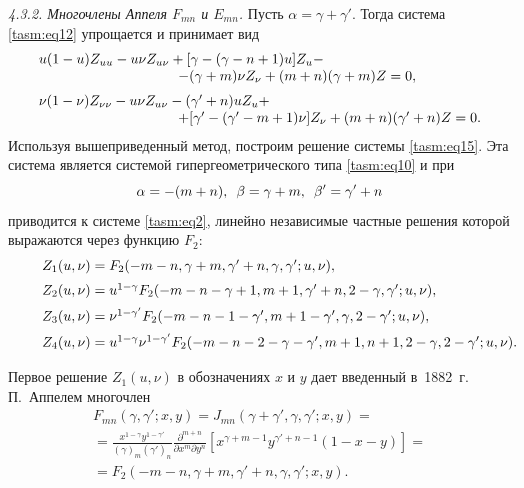\smallskip

\textit{4.3.2. Многочлены Аппеля $F_{mn}$ и $E_{mn}$.} 
Пусть $\alpha=\gamma+\gamma'$. Тогда система \eqref{tasm:eq12} упрощается и принимает
вид
\begin{equation}
\begin{array}{l}
u(1-u)    Z_{uu}-u\nu    Z_{u\nu}+[\gamma-(\gamma-n+1)   
u]    Z_{u}-  \\
\hspace{3.5cm}- (\gamma+m)    \nu     Z_{\nu}+(m+n)    (\gamma+m)    Z=0,\\[2mm]
\nu(1-\nu)    Z_{\nu\nu}-u\nu    Z_{u\nu}-(\gamma'+n)   
u    Z_{u}+ \\ 
\hspace{3.5cm}
+ [\gamma'-(\gamma'-m+1)    \nu]    Z_{\nu}+(m+n)    (\gamma'+n)    Z=0.
\end{array}
\label{tasm:eq15}
\end{equation}
Используя вышеприведенный метод, построим решение системы \eqref{tasm:eq15}.
Эта система является системой гипергеометрического типа \eqref{tasm:eq10} и
при
$$
\alpha=-(m+n), \enskip \beta=\gamma+m, \enskip \beta'=\gamma'+n
$$
приводится к системе \eqref{tasm:eq2}, 
линейно независимые частные решения которой выражаются через функцию $F_{2}$:
\begin{equation}
\begin{array}{l}
Z_{1}(u,\nu)=F_{2}(-m-n, \gamma+m, \gamma'+n, \gamma, \gamma'; u, \nu),\\[0.2cm]
Z_{2}(u,\nu)=u^{1-\gamma}    F_{2}(-m-n-\gamma+1, m+1, \gamma'+n, 2-\gamma, \gamma'; u, \nu),\\[0.2cm]
Z_{3}(u,\nu)=\nu^{1-\gamma'}    F_{2}(-m-n-1-\gamma', m+1-\gamma', \gamma, 2-\gamma'; u, \nu),\\[0.2cm]
Z_{4}(u,\nu)=u^{1-\gamma}    \nu^{1-\gamma'}   
F_{2}(-m-n-2-\gamma-\gamma', m+1, n+1, 2-\gamma, 2-\gamma'; u, \nu). 
\end{array}\hspace{-1cm}
\label{tasm:eq16}
\end{equation}

Первое решение $Z_{1}(u,\nu)$ в обозначениях $x$ и $y$ дает \cite[p.~259]{tasm:9} введенный в~1882~г. П.~Аппелем многочлен
\begin{multline}
F_{mn}(\gamma,\gamma';x,y)=J_{mn}(\gamma+\gamma',\gamma,\gamma';x,y)=
\\
= \frac{x^{1-\gamma}   y^{1-\gamma'}}{(\gamma)_{m}    (\gamma')_{n}}   
\frac{\partial^{m+n}}{\partial x^{m}\partial y^{n}}\left[x^{\gamma+m-1}      y^{\gamma'+n-1}(1-x-y)\right]=
\\
=
F_{2}(-m-n,\gamma+m,\gamma'+n,\gamma,\gamma';x,y).
\end{multline}


